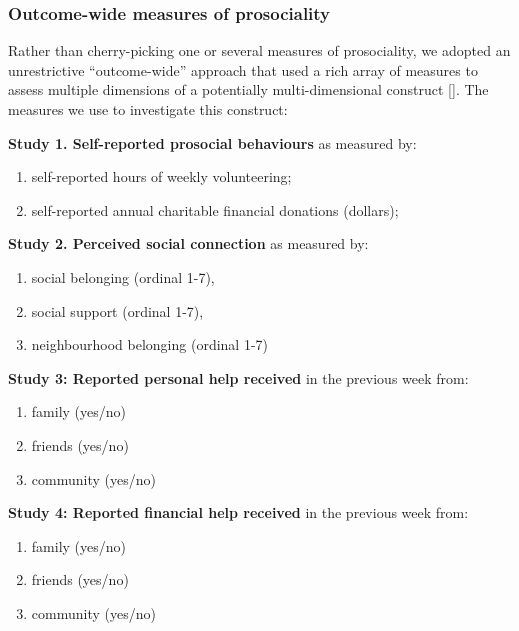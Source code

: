 \documentclass[
  single column]{article}
\providecommand{\tightlist}{%
  \setlength{\itemsep}{0pt}\setlength{\parskip}{0pt}}\usepackage{longtable,booktabs,array}
\begin{document}
\subsubsection{Outcome-wide measures of
prosociality}\label{outcome-wide-measures-of-prosociality}

Rather than cherry-picking one or several measures of prosociality, we
adopted an unrestrictive ``outcome-wide'' approach that used a rich
array of measures to assess multiple dimensions of a potentially
multi-dimensional construct {[}{]}. The measures we use to investigate
this construct:

\textbf{Study 1. Self-reported prosocial behaviours} as measured by:

\begin{enumerate}
\def\labelenumi{(\alph{enumi})}
\tightlist
\item
  self-reported hours of weekly volunteering;
\item
  self-reported annual charitable financial donations (dollars);
\end{enumerate}

\textbf{Study 2. Perceived social connection} as measured by:

\begin{enumerate}
\def\labelenumi{(\alph{enumi})}
\tightlist
\item
  social belonging (ordinal 1-7),
\item
  social support (ordinal 1-7),
\item
  neighbourhood belonging (ordinal 1-7)
\end{enumerate}

\textbf{Study 3: Reported personal help received} in the previous week
from:

\begin{enumerate}
\def\labelenumi{(\alph{enumi})}
\tightlist
\item
  family (yes/no)
\item
  friends (yes/no)
\item
  community (yes/no)
\end{enumerate}

\textbf{Study 4: Reported financial help received} in the previous week
from:

\begin{enumerate}
\def\labelenumi{(\alph{enumi})}
\tightlist
\item
  family (yes/no)
\item
  friends (yes/no)
\item
  community (yes/no)
\end{enumerate}
\end{document}
